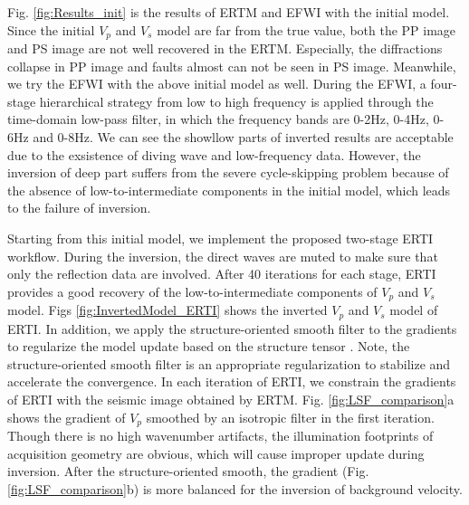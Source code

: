 \documentclass[extra,mreferee]{gji}
\begin{document}
Fig. \ref{fig:Results_init} is the results of ERTM and EFWI with the initial model.
Since the initial
$V_p$ and $V_s$ model are far from the true value, both the PP image  and PS
image are not well recovered
in the ERTM. Especially, the diffractions collapse in PP image and faults almost can not be seen
in PS image. Meanwhile, we try the EFWI with the above initial model as well. 
During the EFWI, 
a four-stage hierarchical strategy 
from low to high frequency is applied through the time-domain low-pass filter, in which the frequency bands
are 0-2Hz, 0-4Hz, 0-6Hz and 0-8Hz. 
We can see the showllow parts of inverted results 
are acceptable due to the exsistence of diving wave and low-frequency data. However, the inversion of
deep part suffers from the severe cycle-skipping problem because of the absence of
low-to-intermediate components in the initial model, which leads to the failure of inversion.

Starting from this initial model, we implement the proposed two-stage ERTI workflow.
During the inversion, the direct waves are muted to make sure that only the reflection data are involved.
After
40 iterations for each stage, ERTI provides a good recovery of the low-to-intermediate components of
$V_p$ and $V_s$ model. 
Figs \ref{fig:InvertedModel_ERTI} shows the inverted $V_p$ and $V_s$ model of ERTI.
In addition, we apply the structure-oriented smooth filter to the gradients to regularize the
model update based on the structure tensor \cite[]{Hale2009Structure,
Ma2010, Williamson2011}.
Note, the structure-oriented smooth filter is an appropriate regularization to stabilize
and accelerate the convergence. 
In each iteration of ERTI, we constrain the gradients of ERTI with the seismic image
obtained by ERTM. Fig. \ref{fig:LSF_comparison}a shows the gradient of
$V_p$ smoothed by an isotropic filter in the first iteration. Though there is no high wavenumber
artifacts, the illumination footprints of acquisition geometry are obvious, which will cause
improper update during inversion. After the structure-oriented smooth, the gradient
(Fig. \ref{fig:LSF_comparison}b) is more balanced
for the inversion of background velocity. 
\end{document}
